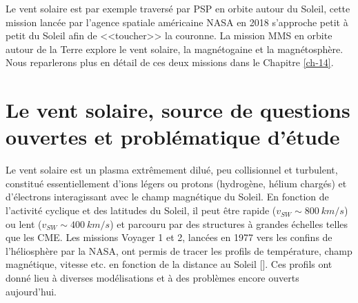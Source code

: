 Le vent solaire est par exemple traversé par \ac{PSP} en orbite autour du Soleil, cette mission lancée par l'agence spatiale américaine \acs{NASA} en 2018 s'approche petit à petit du Soleil afin de <<toucher>> la couronne. La mission \ac{MMS} en orbite autour de la Terre explore le vent solaire, la magnétogaine et la magnétosphère. Nous reparlerons plus en détail de ces deux missions dans le Chapitre \ref{ch-14}. 

\section{Le vent solaire, source de questions ouvertes et problématique d'étude} \label{sec-022}

Le vent solaire est un plasma extrêmement dilué, peu collisionnel et turbulent, constitué essentiellement d'ions légers ou protons (hydrogène, hélium chargés) et d'électrons interagissant avec le champ magnétique du Soleil. En fonction de l'activité cyclique et des latitudes du Soleil, il peut être rapide ($v_{SW} \sim \SI{800}{km/s}$) ou lent ($v_{SW} \sim \SI{400}{km/s}$) et parcouru par des structures à grandes échelles telles que les \ac{CME}. Les missions Voyager 1 et 2, lancées en 1977 vers les confins de l'héliosphère par la NASA, ont permis de tracer les profils de température, champ magnétique, vitesse etc. en fonction de la distance au Soleil [\cite{richardson_radial_1995}]. Ces profils ont donné lieu à diverses modélisations et à des problèmes encore ouverts aujourd'hui. 

